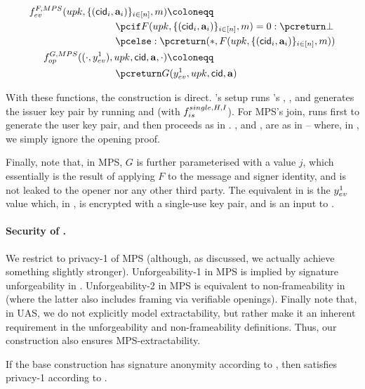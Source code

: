 \begin{align}
  \feval^{F,MPS}(\upk,\lbrace (\cid_i,\attrs_i) \rbrace_{i\in[n]},\msg)
  \coloneqq & \nonumber \\
  & \hspace*{-10em} \pcif F(\upk,\lbrace (\cid_i,\attrs_i) \rbrace_{i\in[n]},
    \msg) = 0: \pcreturn \bot \nonumber \\
  & \hspace*{-10em} \pcelse: \pcreturn (\ast,F(\upk,\lbrace(\cid_i,\attrs_i)
    \rbrace_{i\in[n]},\msg)) \nonumber \\
  \finsp^{G,MPS}((\cdot,\yeval^1),\upk,\cid,\attrs,\cdot) \coloneqq
  & \nonumber \\
  & \hspace*{-10em} \pcreturn G(\yeval^1,\upk,\cid,\attrs)
    \label{eq:funcs-mps}
\end{align}

With these functions, the construction is direct. \CUASMPS's setup runs
\CUASGen's \Setup, \OKeyGen, and generates the issuer key pair by running
\KeyGen and \ISet (with $f_{is}^{single,H,I}$). For MPS's join, \CUASMPS runs
first \KeyGen to generate the user key pair, and then proceeds as in \CUASGen.
\Sign, \Verify and \Open, are as in \CUASGen -- where, in \Open, we simply
ignore the opening proof.

Finally, note that, in MPS, $G$ is further parameterised with a value $j$, which
essentially is the result of applying $F$ to the message and signer identity,
and is not leaked to the opener nor any other third party. The equivalent in
\UAS is the $y_{ev}^1$ value which, in \CUASGen, is encrypted with a single-use
key pair, and is an input to \finsp.

\paragraph{Security of \CUASMPS.} %
We restrict to privacy-1 of MPS (although, as
discussed, we actually achieve something slightly stronger). Unforgeability-1 in
MPS is implied by signature unforgeability in \UAS.
Unforgeability-2 in MPS is equivalent to non-frameability in \UAS (where the
latter also includes framing via verifiable openings). Finally note that, in
UAS, we do not explicitly model extractability, but rather make it an inherent
requirement in the unforgeability and non-frameability definitions. Thus, our
\CUASMPS construction also ensures MPS-extractability.

\begin{theorem}
  If the base \CUASGen construction has signature anonymity according to
  , then \CUASMPS satisfies privacy-1
  according to \cite{ngsy22}.
\end{theorem}

